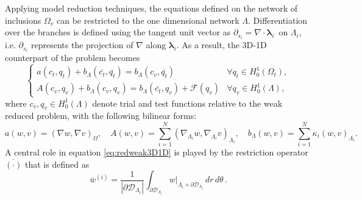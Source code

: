 \documentclass[10pt]{article} %
\def\bct{\overline{c_t}}
\def\bqt{\overline{q_t}}
\begin{document}
	Applying model reduction techniques, the equations defined on the network of inclusions $\Omega_v$ can be restricted to the one dimensional network $\Lambda$. Differentiation over the branches is defined using the tangent unit vector as ${\partial_{s_i}} = \nabla \cdot \pmb{\lambda}_i\,$ on $ \Lambda_i$, i.e. ${\partial_{s_i}}$ represents the projection of $\nabla$ along $\boldsymbol \lambda_i$. \newline	
	As a result, the 3D-1D counterpart of the problem becomes
	\begin{equation}\label{eq:redweak3D1D}
		\begin{cases}
			a(c_t,q_t) + b_\Lambda(\bct,\bqt) = b_\Lambda(c_v,\bqt) & \forall q_t \in H^1_0(\Omega_t),
			\\
			A(c_v,q_v) + b_\Lambda(c_v,q_v) = b_\Lambda(\bct,q_v) + \mathcal{F} (q_v) & \forall q_v \in H^1_0(\Lambda),
		\end{cases}
	\end{equation}
	where $c_v,q_v \in H^1_0(\Lambda)$ denote trial and test functions relative to the weak reduced problem, with the following bilinear forms:
	\begin{equation*}
		a(w,v) = (\nabla w,\nabla v)_{\Omega}, 
		\quad
		A(w,v) = \sum_{i=1}^N (\nabla_{\Lambda_i} w, \nabla_{\Lambda_i} v)_{\Lambda_i}, 
		\quad 
		b_\Lambda(w,v) = \sum_{i=1}^N \kappa_i (w,v)_{\Lambda_i}.
	\end{equation*}
	A central role in equation \eqref{eq:redweak3D1D} is played by the restriction operator $\overline{(\cdot)}$ that is defined as
	\begin{equation*}
		\overline{w}^{(i)} = 
		\frac{1}{|\partial\mathcal{D}_{\Lambda_i}|} \int_{\partial\mathcal{D}_{\Lambda_i}} w|_{\Lambda_i \times \partial\mathcal{D}_{\Lambda_i}}\,dr\,d\theta\,.
	\end{equation*}
	
\end{document}
